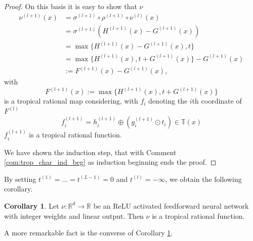 \documentclass{article}
\theoremstyle{definition}
\newtheorem{corollary}[theorem]{Corollary}
\newtheorem{comment}[theorem]{Comment}
\begin{document}
\begin{proof}
On this basis it is easy to show that $\nu$
\begin{align*}
\nu^{(l+1)}(x) 
&= \sigma^{(l+1)} \circ \rho^{(l+1)} \circ \nu^{(l)}(x) \\
&= \sigma^{(l+1)} (H^{(l+1)}(x) - G^{(l+1)}(x)) \\
&= \max\{ H^{(l+1)}(x) - G^{(l+1)}(x), t\} \\
&= \max\{ H^{(l+1)}(x), t + G^{(l+1)}(x)\} - G^{(l+1)}(x) \\
&:= F^{(l+1)}(x) - G^{(l+1)}(x),
\end{align*}
with
$$F^{(l+1)}(x) := \max\{ H^{(l+1)}(x), t + G^{(l+1)}(x)\}$$
is a tropical rational map considering, with $f_{i}$ denoting the $i$th coordinate of $F^{(l)}$
$$f_{i}^{(l+1)} = h_{i}^{(l+1)} \oplus (g_{i}^{(l+1)} \odot t_{i}) \in \mathbb{T}(x)$$
$f_{i}^{(l+1)}$ is a tropical rational function.

We have shown the induction step, that with Comment \ref{com:trop_char_ind_beg} as induction beginning ends the proof.
\end{proof}

By setting $t^{(1)} = \dots = t^{(L-1)} = 0$ and $t^{(l)} = - \infty$, we obtain the following corollary.

\begin{corollary}
\label{cor:relu_trop_rat_fkt}
Let $\nu : \mathbb{R}^{d} \to \mathbb{R}$ be an ReLU activated feedforward neural network with integer weights and linear output. Then $\nu$ is a tropical rational function.
\end{corollary}

A more remarkable fact is the converse of Corollary \ref{cor:relu_trop_rat_fkt}.
\end{document}
